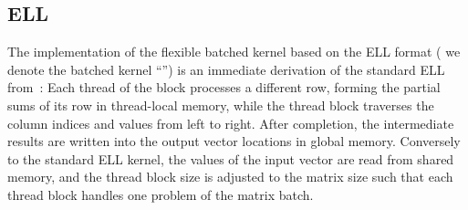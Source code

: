 \subsection{ELL}
The implementation of the flexible batched \spmv kernel based on the ELL format
( we denote the batched kernel ``\ell'')
is an immediate derivation of the standard ELL \spmv from~\cite{garlandspmv}:
Each thread of the block processes a different row, forming the partial
sums of its row in thread-local memory, while the thread block traverses the column indices
and values from left to right. After completion, the intermediate results are written into the output
vector locations in global memory.
Conversely to the standard ELL kernel, the values of the input vector are read from shared memory,
and the thread block size is adjusted to the matrix size such that each thread block handles
one problem of the matrix batch.

